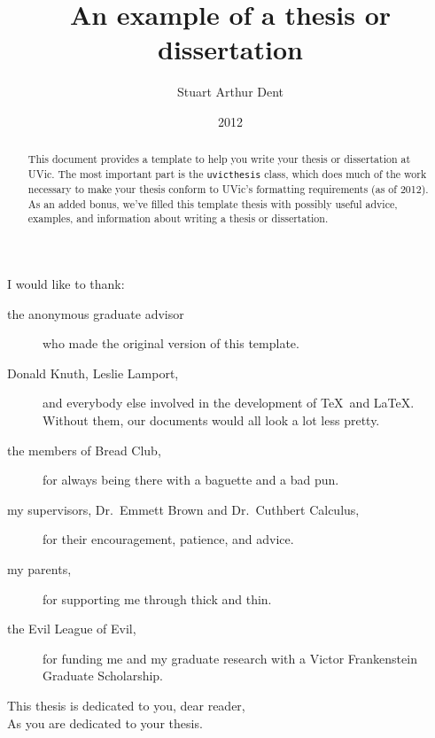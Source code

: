 \documentclass[12pt,oneside]{uvicthesis}
\title{An example of a thesis or dissertation}
\author{Stuart Arthur Dent}
\date{2012}
\begin{document}
\frontmatter
\maketitle
\makecommittee

\begin{abstract}
	This document provides a template to help you write your thesis or dissertation at UVic. The most important part is the \texttt{uvicthesis} class, which does much of the work necessary to make your thesis conform to UVic's formatting requirements (as of 2012). As an added bonus, we've filled this template thesis with possibly useful advice, examples, and information about writing a thesis or dissertation.
\end{abstract}

\newpage{}\tableofcontents
\newpage{}\listoftables
\newpage{}\listoffigures

\begin{acknowledgements}
	\noindent I would like to thank:
	\begin{description}
	\item[the anonymous graduate advisor] who made the original version of this template.
	\item[Donald Knuth, Leslie Lamport,] and everybody else involved in the development of \TeX\ and \LaTeX. Without them, our documents would all look a lot less pretty.
	\item[the members of Bread Club,] for always being there with a baguette and a bad pun.
	\item[my supervisors, Dr.\ Emmett Brown and Dr.\ Cuthbert Calculus,]
		for their encouragement, patience, and advice.
	\item[my parents,] for supporting me through thick and thin.
	\item[the Evil League of Evil,]
		for funding me and my graduate research with a Victor Frankenstein Graduate Scholarship.
	\end{description}
\end{acknowledgements}

\begin{dedication}
	\noindent This thesis is dedicated to you, dear reader,\\
	As you are dedicated to your thesis.
\end{dedication}
\mainmatter
\end{document}
